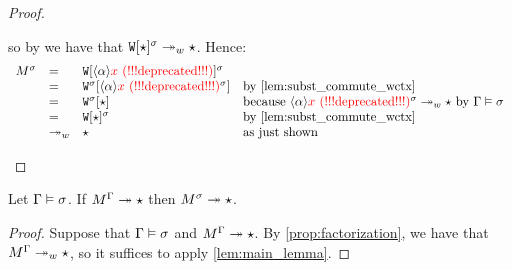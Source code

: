\begin{proof}
\begin{enumerate}
\begin{enumerate}
    so by \ih we have that
    $\mathtt{W}[\star]^{\sigma} \twoheadrightarrow_{w} \star$.
    Hence:
    \[
      \begin{array}{rlll}
        \subs{\utm}{\subst}
      & = &
        \subs{\ctxof{\wctx}{\verifbtyp{\var}}}{\subst}
      \\
      & = &
        \ctxof{\subs{\wctx}{\subst}}{\verifbtyp{\subs{\var}{\subst}}}
        & \text{by \cref{lem:subst_commute_wctx}}
      \\
      & = &
        \ctxof{\subs{\wctx}{\subst}}{\iunit}
        & \text{because $\verifbtyp{\subs{\var}{\subst}} \tows \iunit$ by $\compat{\tenv}{\subst}$}
      \\
      & = &
        \subs{\ctxof{\wctx}{\iunit}}{\subst}
        & \text{by \cref{lem:subst_commute_wctx}}
      \\
      & \tows &
        \iunit
        & \text{as just shown}
      \end{array}
    \]
  \end{enumerate}
\end{enumerate}
\end{proof}

\begin{lemma}[Adequacy]
\label{lem:adequacy}
Let $\Gamma\vDash\sigma$.
If $M^{\Gamma} \twoheadrightarrow \star$
then $M^{\sigma} \twoheadrightarrow \star$.
\end{lemma}
\begin{proof}
Suppose that $\Gamma\vDash\sigma$ and $M^{\Gamma} \twoheadrightarrow \star$.
By \cref{prop:factorization}, we have that $M^{\Gamma} \twoheadrightarrow_{w} \star$,
so it suffices to apply \cref{lem:main_lemma}.
\end{proof}

